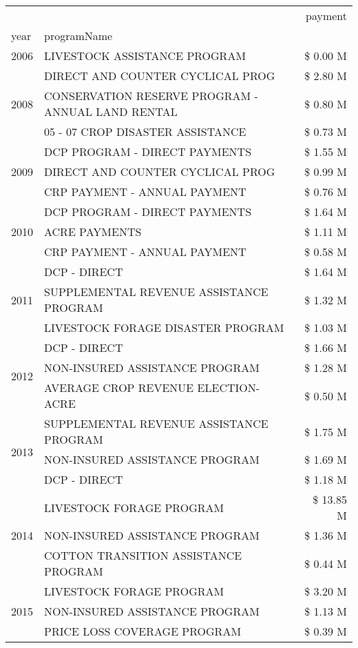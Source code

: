 \begin{tabular}{llr}
\toprule
 &  & payment \\
year & programName &  \\
\midrule
2006 & LIVESTOCK ASSISTANCE PROGRAM & \$ 0.00 M \\
\cline{1-3}
\multirow[t]{3}{*}{2008} & DIRECT AND COUNTER CYCLICAL PROG & \$ 2.80 M \\
 & CONSERVATION RESERVE PROGRAM - ANNUAL LAND RENTAL & \$ 0.80 M \\
 & 05 - 07 CROP DISASTER ASSISTANCE & \$ 0.73 M \\
\cline{1-3}
\multirow[t]{3}{*}{2009} & DCP PROGRAM - DIRECT PAYMENTS & \$ 1.55 M \\
 & DIRECT AND COUNTER CYCLICAL PROG & \$ 0.99 M \\
 & CRP PAYMENT - ANNUAL PAYMENT & \$ 0.76 M \\
\cline{1-3}
\multirow[t]{3}{*}{2010} & DCP PROGRAM - DIRECT PAYMENTS & \$ 1.64 M \\
 & ACRE PAYMENTS & \$ 1.11 M \\
 & CRP PAYMENT - ANNUAL PAYMENT & \$ 0.58 M \\
\cline{1-3}
\multirow[t]{3}{*}{2011} & DCP - DIRECT & \$ 1.64 M \\
 & SUPPLEMENTAL REVENUE ASSISTANCE PROGRAM & \$ 1.32 M \\
 & LIVESTOCK FORAGE DISASTER PROGRAM & \$ 1.03 M \\
\cline{1-3}
\multirow[t]{3}{*}{2012} & DCP - DIRECT & \$ 1.66 M \\
 & NON-INSURED ASSISTANCE PROGRAM & \$ 1.28 M \\
 & AVERAGE CROP REVENUE ELECTION-ACRE & \$ 0.50 M \\
\cline{1-3}
\multirow[t]{3}{*}{2013} & SUPPLEMENTAL REVENUE ASSISTANCE PROGRAM & \$ 1.75 M \\
 & NON-INSURED ASSISTANCE PROGRAM & \$ 1.69 M \\
 & DCP - DIRECT & \$ 1.18 M \\
\cline{1-3}
\multirow[t]{3}{*}{2014} & LIVESTOCK FORAGE PROGRAM & \$ 13.85 M \\
 & NON-INSURED ASSISTANCE PROGRAM & \$ 1.36 M \\
 & COTTON TRANSITION ASSISTANCE PROGRAM & \$ 0.44 M \\
\cline{1-3}
\multirow[t]{3}{*}{2015} & LIVESTOCK FORAGE PROGRAM & \$ 3.20 M \\
 & NON-INSURED ASSISTANCE PROGRAM & \$ 1.13 M \\
 & PRICE LOSS COVERAGE PROGRAM & \$ 0.39 M \\

\end{tabular}
